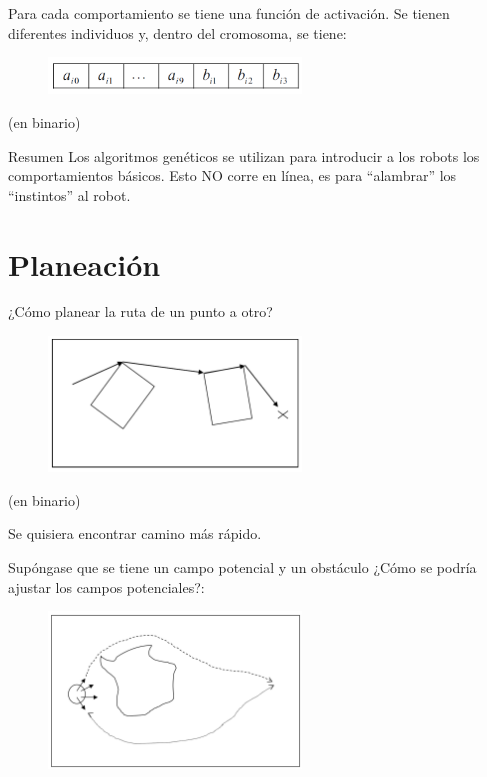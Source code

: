 Para cada comportamiento se tiene una función de activación. Se tienen diferentes individuos y, dentro
del cromosoma, se tiene:



\begin{figure}[h!]
\centering
\includegraphics[width=0.6\textwidth]{images/img95.png}
\label{figura95}
\end{figure}
(en binario)

\begin{scaja}
	Resumen
	Los algoritmos genéticos se utilizan para introducir a los robots los comportamientos básicos. Esto NO corre
	en línea, es para “alambrar” los “instintos” al robot. 
\end{scaja}

\section{Planeación}

¿Cómo planear la ruta de un punto a otro? 

\begin{figure}[h!]
	\centering
	\includegraphics[width=0.6\textwidth]{images/img96.png}
	\label{figura96}
\end{figure}
(en binario)

Se quisiera encontrar camino más rápido.

Supóngase que se tiene un campo potencial y un obstáculo
¿Cómo se podría ajustar los campos potenciales?:

\begin{figure}[h!]
	\centering
	\includegraphics[width=0.6\textwidth]{images/img97.png}
	\label{figura97}
\end{figure}


